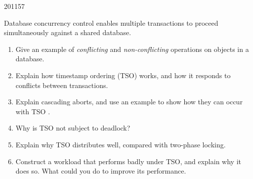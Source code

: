 \documentclass[10pt,\jkfside,a4paper]{article}
\begin{document}
\begin{examquestion}{2011}{5}{7}

Database concurrency control enables multiple transactions to proceed
simultaneously against a shared database.

\begin{enumerate}[label=(\alph*)]

\item Give an example of \textit{conflicting} and \textit{non-conflicting}
operations on objects in a database.


\item Explain how timestamp ordering (TSO) works, and how it responds to
conflicts between transactions.


\item Explain cascading aborts, and use an example to show how they can
occur with TSO .


\item Why is TSO not subject to deadlock?


\item Explain why TSO distributes well, compared with two-phase locking.


\item Construct a workload that performs badly under TSO, and explain why it
does so. What could you do to improve its performance.


\end{enumerate}

\end{examquestion}
\end{document}
